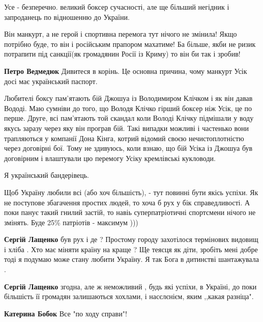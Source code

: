 \begin{itemize}
Усе - безперечно. великий боксер сучасності, але ще більший негідник і запроданець по відношенню до України.


Він манкурт, а не герой і спортивна перемога тут нічого не змінила! Якщо
потрібно буде, то він і російським прапором махатиме! Ба більше, якби не ризик
потрапити під санкції(як громадянин Росії із Криму) то він би так і зробив!

\begin{itemize} %
\textbf{Петро Ведмедюк} Дивитеся в корінь. Це основна причина, чому манкурт Усік досі має український паспорт.
\end{itemize} %


Любителі боксу пам'ятають бій Джошуа із Володимиром Клічком і як він давав
Вододі. Маю сумніви до того, що Володя Клічко гірший боксер ніж Усік, це по
перше. Друге, всі пам'ятають той скандал коли Володі Клічку підмішали у воду
якусь заразу через яку він програв бій. Такі випадки можливі і частенько вони
трапляються у компанії Дона Кінга, котрий відомий своєю нечистоплотністю через
договірні бої. Тому не здивуюсь, коли взнаю, що бій Усіка із Джошуа був
договірним і влаштували цю перемогу Усіку кремлівські кукловоди.


Я український бандерівець.


Щоб Україну любили всі (або хоч більшість), - тут повинні бути якісь успіхи. Як
не поступове збагачення простих людей, то хоча б рух у бік справедливості. А
поки панує такий гнилий застій, то навіь суперпатріотичні спортсмени нічого не
змінять. Буде 25\% патріотів - максимум )))

\begin{itemize} %
\textbf{Сергій Лащенко} був рух і де ? Простому городу захотілося термінових видовищ і хліба . Хто має міняти країну на краще ? Ще теясця як діти, зробіть мені добре тоді я подумаю може стану любити Україну. Я так Бога в дитинстві шантажувала .

\textbf{Сергій Лащенко} згодна, але ж неможливий , будь які успіхи, в Україні, до поки більшість її громадян залишаються хохлами, і насєлєнієм, яким ,,какая разніца".

\textbf{Катерина Бобок} Все "по ходу справи"!
\end{itemize} %


\end{itemize}
